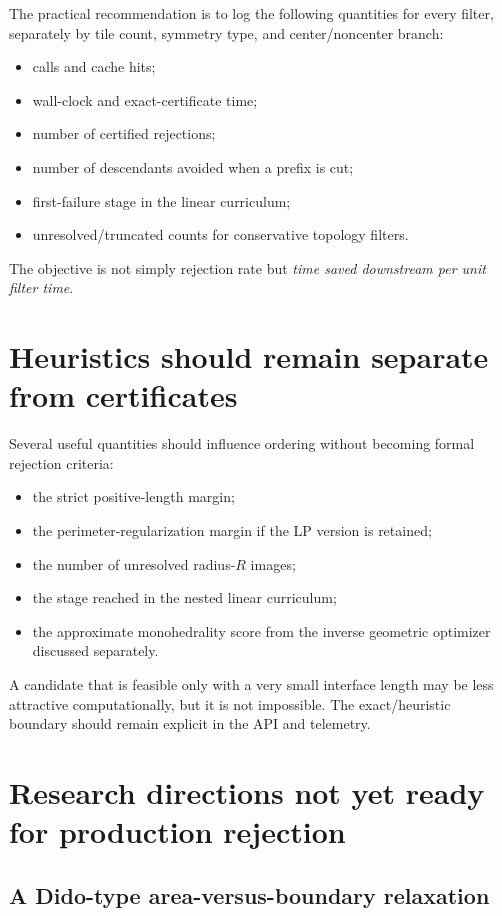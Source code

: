 \documentclass[11pt]{article}
\theoremstyle{definition}
\theoremstyle{remark}
\begin{document}
The practical recommendation is to log the following quantities for every filter,
separately by tile count, symmetry type, and center/noncenter branch:
\begin{itemize}
\item calls and cache hits;
\item wall-clock and exact-certificate time;
\item number of certified rejections;
\item number of descendants avoided when a prefix is cut;
\item first-failure stage in the linear curriculum;
\item unresolved/truncated counts for conservative topology filters.
\end{itemize}
The objective is not simply rejection rate but \emph{time saved downstream per unit filter time}.

\section{Heuristics should remain separate from certificates}

Several useful quantities should influence ordering without becoming formal rejection criteria:
\begin{itemize}
\item the strict positive-length margin;
\item the perimeter-regularization margin if the LP version is retained;
\item the number of unresolved radius-$R$ images;
\item the stage reached in the nested linear curriculum;
\item the approximate monohedrality score from the inverse geometric optimizer discussed separately.
\end{itemize}

A candidate that is feasible only with a very small interface length may be less attractive computationally, but it is not impossible.  The exact/heuristic boundary should remain explicit in the API and telemetry.

\section{Research directions not yet ready for production rejection}

\subsection{A Dido-type area-versus-boundary relaxation}
\end{document}
